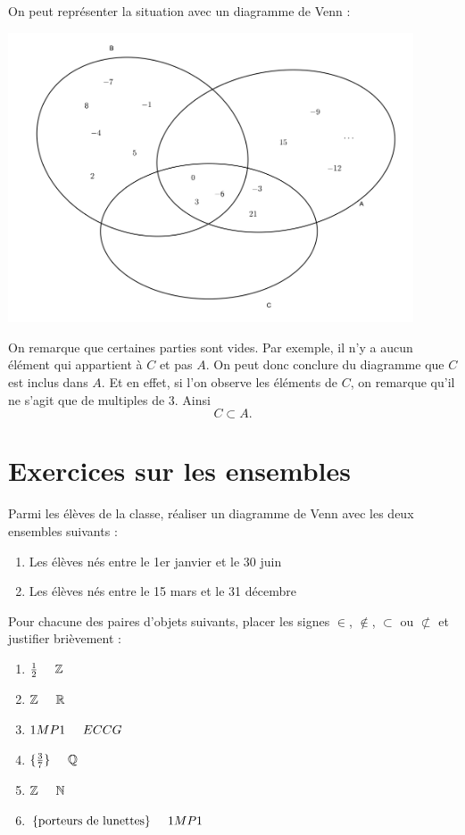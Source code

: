 On peut représenter la situation avec un diagramme de Venn :
\begin{center}
\includegraphics[width = 0.9\textwidth]{ensemble/exemple.png}
\end{center}

On remarque que certaines parties sont vides. Par exemple, il n'y a aucun élément qui appartient à $C$ et pas $A$. On peut donc conclure du diagramme que $C$ est inclus dans $A$. Et en effet, si l'on observe les éléments de $C$, on remarque qu'il ne s'agit que de multiples de $3$. Ainsi 
$$
C \subset A.
$$
\newpage

\section{Exercices sur les ensembles}

\begin{exercice}Parmi les élèves de la classe, réaliser un diagramme de Venn avec les deux ensembles suivants :
	\begin{enumerate}[A]
	\item Les élèves nés entre le 1er janvier et le 30 juin
	\item Les élèves nés entre le 15 mars et le 31 décembre
	\end{enumerate}
\end{exercice}

\begin{exercice}Pour chacune des paires d'objets suivants, placer les signes $\in$, $\notin$, $\subset$ ou $\not \subset$ et justifier brièvement :
	\begin{enumerate}
	\item $\frac{1}{2} \hspace{5mm} \mathbb{Z}$
	\item $\mathbb{Z} \hspace{5mm} \mathbb{R}$
	\item $1MP1 \hspace{5mm} ECCG$
	\item $\{\frac{3}{7}\} \hspace{5mm} \mathbb{Q}$
	\item $\mathbb{Z} \hspace{5mm} \mathbb{N}$
	\item $\{\mbox{porteurs de lunettes}\} \hspace{5mm} 1MP1$
	\end{enumerate}
\end{exercice}

